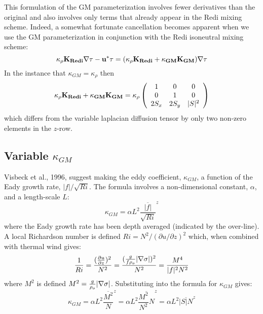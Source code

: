 This formulation of the GM parameterization involves fewer derivatives
than the original and also involves only terms that already appear in
the Redi mixing scheme. Indeed, a somewhat fortunate cancellation
becomes apparent when we use the GM parameterization in conjunction
with the Redi isoneutral mixing scheme:
\begin{equation}
\kappa_\rho \bf{K}_{Redi} \bf{\nabla} \tau
- u^* \tau = 
( \kappa_\rho \bf{K}_{Redi} + \kappa_{GM} \bf{K}_{GM} ) \bf{\nabla} \tau
\end{equation}
In the instance that $\kappa_{GM} = \kappa_{\rho}$ then
\begin{equation}
\kappa_\rho \bf{K}_{Redi} + \kappa_{GM} \bf{K}_{GM} =
\kappa_\rho
\left( \begin{array}{ccc}
1 & 0 & 0 \\
0 & 1 & 0 \\
2 S_x & 2 S_y & |S|^2 
\end{array}
\right)
\end{equation}
which differs from the variable laplacian diffusion tensor by only
two non-zero elements in the $z$-row.

\subsection{Variable $\kappa_{GM}$}

Visbeck et al., 1996, suggest making the eddy coefficient,
$\kappa_{GM}$, a function of the Eady growth rate,
$|f|/\sqrt{Ri}$. The formula involves a non-dimensional constant,
$\alpha$, and a length-scale $L$:
\begin{displaymath}
\kappa_{GM} = \alpha L^2 \overline{ \frac{|f|}{\sqrt{Ri}} }^z
\end{displaymath}
where the Eady growth rate has been depth averaged (indicated by the
over-line). A local Richardson number is defined $Ri = N^2 / (\partial
u/\partial z)^2$ which, when combined with thermal wind gives:
\begin{displaymath}
\frac{1}{Ri} = \frac{(\frac{\partial u}{\partial z})^2}{N^2} =
\frac{ ( \frac{g}{f \rho_o} | {\bf \nabla} \sigma | )^2 }{N^2} =
\frac{ M^4 }{ |f|^2 N^2 }
\end{displaymath}
where $M^2$ is defined $M^2 = \frac{g}{\rho_o} |{\bf \nabla} \sigma|$.
Substituting into the formula for $\kappa_{GM}$ gives:
\begin{displaymath}
\kappa_{GM} = \alpha L^2 \overline{ \frac{M^2}{N} }^z =
\alpha L^2 \overline{ \frac{M^2}{N^2} N }^z =
\alpha L^2 \overline{ |S| N }^z
\end{displaymath}


